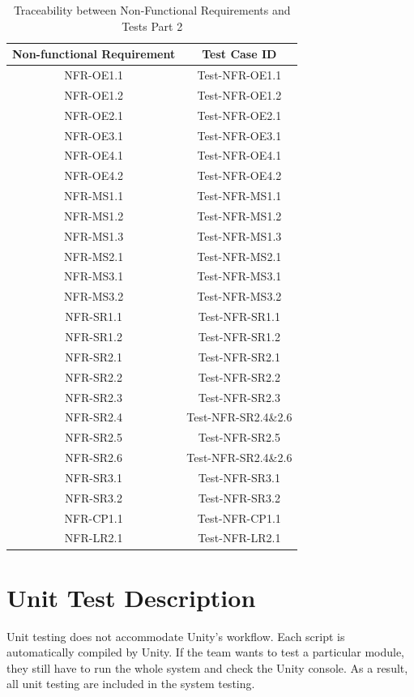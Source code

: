 \documentclass[12pt, titlepage]{article}
\begin{document}
\begin{table}[H]
    \centering
    \begin{tabular}{|c|c|}
    \hline
    Non-functional Requirement & Test Case ID\\
    \hline
    NFR-OE1.1 & Test-NFR-OE1.1\\
    \hline
    NFR-OE1.2 & Test-NFR-OE1.2\\
    \hline
    NFR-OE2.1 & Test-NFR-OE2.1\\
    \hline
    NFR-OE3.1 & Test-NFR-OE3.1\\
    \hline
    NFR-OE4.1 & Test-NFR-OE4.1\\
    \hline
    NFR-OE4.2 & Test-NFR-OE4.2\\
    \hline
    NFR-MS1.1 & Test-NFR-MS1.1\\
    \hline
    NFR-MS1.2 & Test-NFR-MS1.2\\
    \hline
    NFR-MS1.3 & Test-NFR-MS1.3\\
    \hline
    NFR-MS2.1 & Test-NFR-MS2.1\\
    \hline
    NFR-MS3.1 & Test-NFR-MS3.1\\
    \hline
    NFR-MS3.2 & Test-NFR-MS3.2\\
    \hline
    NFR-SR1.1 & Test-NFR-SR1.1\\
    \hline
    NFR-SR1.2 & Test-NFR-SR1.2\\
    \hline
    NFR-SR2.1 & Test-NFR-SR2.1\\
    \hline
    NFR-SR2.2 & Test-NFR-SR2.2\\
    \hline
    NFR-SR2.3 & Test-NFR-SR2.3\\
    \hline
    NFR-SR2.4 & Test-NFR-SR2.4\&2.6\\
    \hline
    NFR-SR2.5 & Test-NFR-SR2.5\\
    \hline
    NFR-SR2.6 & Test-NFR-SR2.4\&2.6\\
    \hline
    NFR-SR3.1 & Test-NFR-SR3.1\\
    \hline
    NFR-SR3.2 & Test-NFR-SR3.2\\
    \hline
    NFR-CP1.1 & Test-NFR-CP1.1\\
    \hline
    NFR-LR2.1 & Test-NFR-LR2.1\\
    \hline
    \end{tabular}
    \caption{Traceability between Non-Functional Requirements and Tests Part 2}
\end{table}
\newpage
\section{Unit Test Description}
Unit testing does not accommodate Unity's workflow. Each script is 
automatically compiled by Unity. If the team wants to test a particular
module, they still have to run the whole system and check the Unity 
console. As a result, all unit testing are included in the system 
testing. 
\end{document}

